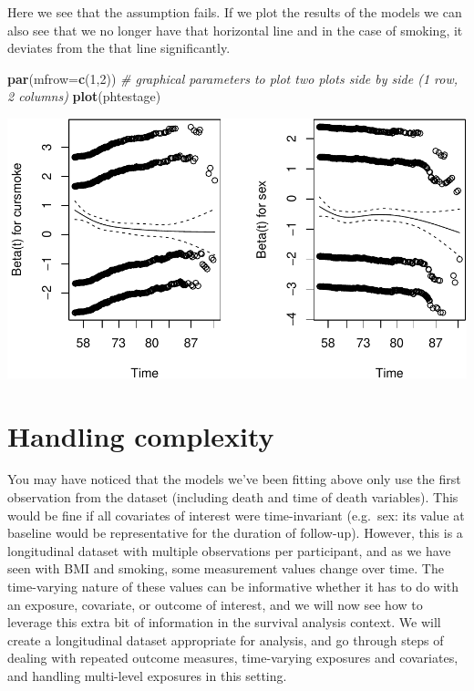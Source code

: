 \documentclass[
]{book}
\newenvironment{Shaded}{\begin{snugshade}}{\end{snugshade}}
\newcommand{\CommentTok}[1]{\textcolor[rgb]{0.56,0.35,0.01}{\textit{#1}}}
\newcommand{\DataTypeTok}[1]{\textcolor[rgb]{0.13,0.29,0.53}{#1}}
\newcommand{\DecValTok}[1]{\textcolor[rgb]{0.00,0.00,0.81}{#1}}
\newcommand{\KeywordTok}[1]{\textcolor[rgb]{0.13,0.29,0.53}{\textbf{#1}}}
\newcommand{\NormalTok}[1]{#1}
\begin{document}
Here we see that the assumption fails. If we plot the results of the models we can also see that we no longer have that horizontal line and in the case of smoking, it deviates from the that line significantly.

\begin{Shaded}
\begin{Highlighting}[]
\KeywordTok{par}\NormalTok{(}\DataTypeTok{mfrow=}\KeywordTok{c}\NormalTok{(}\DecValTok{1}\NormalTok{,}\DecValTok{2}\NormalTok{)) }\CommentTok{# graphical parameters to plot two plots side by side (1 row, 2 columns)}
\KeywordTok{plot}\NormalTok{(phtestage)}
\end{Highlighting}
\end{Shaded}

\includegraphics{adv_epi_analysis_files/figure-latex/unnamed-chunk-217-1.pdf}

\hypertarget{handling-complexity}{%
\section{Handling complexity}\label{handling-complexity}}

You may have noticed that the models we've been fitting above only use the first observation from the dataset (including death and time of death variables). This would be fine if all covariates of interest were time-invariant (e.g.~sex: its value at baseline would be representative for the duration of follow-up). However, this is a longitudinal dataset with multiple observations per participant, and as we have seen with BMI and smoking, some measurement values change over time. The time-varying nature of these values can be informative whether it has to do with an exposure, covariate, or outcome of interest, and we will now see how to leverage this extra bit of information in the survival analysis context. We will create a longitudinal dataset appropriate for analysis, and go through steps of dealing with repeated outcome measures, time-varying exposures and covariates, and handling multi-level exposures in this setting.
\end{document}
